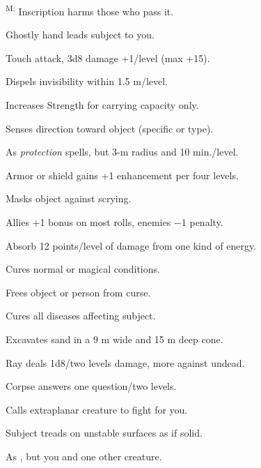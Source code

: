 \textsuperscript{M:} Inscription harms those who pass it.

 Ghostly hand leads subject to you.

 Touch attack, 3d8 damage +1/level (max +15).

 Dispels invisibility within 1.5 m/level.

 Increases Strength for carrying capacity only. %

 Senses direction toward object (specific or type).

 As \emph{protection} spells, but 3-m radius and 10 min./level.

 Armor or shield gains +1 enhancement per four levels.


 Masks object against scrying.

 Allies +1 bonus on most rolls, enemies $-1$ penalty.

 Absorb 12 points/level of damage from one kind of energy.

 Cures normal or magical conditions.

 Frees object or person from curse.

 Cures all diseases affecting subject.

 Excavates sand in a 9 m wide and 15 m deep cone. %

 Ray deals 1d8/two levels damage, more against undead.

 Corpse answers one question/two levels.


 Calls extraplanar creature to fight for you.

 Subject treads on unstable surfaces as if solid. %

 As , but you and one other creature.


